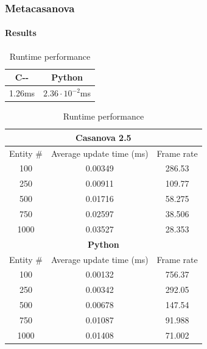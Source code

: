 \documentclass[10pt,a4paper]{beamer}
\begin{document}
\begin{frame}
\frametitle{Metacasanova}
\framesubtitle{Results}
\begin{table}
	\centering
	\small
	\caption{Runtime performance}
	\begin{tabular}{|c|c|}
		\hline
		\textbf{C-{}-} & \textbf{Python} \\
		\hline
		1.26ms & $2.36 \cdot 10^{-2}$ms \\
		\hline
	\end{tabular}

		\begin{tabular}{|c|c|c|}
			\hline
			\multicolumn{3}{|c|}{\textbf{Casanova 2.5}} \\
			\hline
			Entity \# & Average update time (ms) & Frame rate \\
			\hline
			100 & 0.00349 & 286.53 \\
			\hline
			250 & 0.00911 & 109.77 \\
			\hline
			500 & 0.01716 & 58.275 \\
			\hline
			750 & 0.02597 & 38.506 \\
			\hline
			1000 & 0.03527 & 28.353 \\
			\hline
			\multicolumn{3}{|c|}{\textbf{Python}} \\
			\hline
			Entity \# & Average update time (ms) & Frame rate \\
			\hline
			100 & 0.00132 & 756.37 \\
			\hline
			250 & 0.00342 & 292.05 \\
			\hline
			500 & 0.00678 & 147.54 \\
			\hline
			750 & 0.01087 & 91.988 \\
			\hline
			1000 & 0.01408 & 71.002 \\
			\hline
		\end{tabular}
\end{table}
\end{frame}
\end{document}
